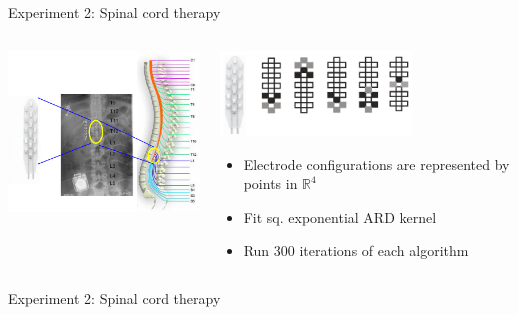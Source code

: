 \documentclass[xetex,10pt,mathserif]{beamer}
\newlength\figureheight
\newlength\figurewidth
\begin{document}
\begin{frame}{Experiment 2: Spinal cord therapy}
\begin{columns}[c]
\begin{center}
\includegraphics[width=2.5in]{figures/config1.png}
\end{center}
\begin{center}
\includegraphics[width=2in]{figures/config2.png}
\vspace{2em}
\begin{itemize}
\item Electrode configurations are represented by points in $\mathbb{R}^4$
\vspace{1em}
\item Fit sq. exponential ARD kernel
\vspace{1em}
\item Run 300 iterations of each algorithm
\end{itemize}
\end{center}
\end{columns}
\end{frame}

\begin{frame}{Experiment 2: Spinal cord therapy}
\begin{columns}[c]
\begin{center}
\setlength\figurewidth{2.5in}
\setlength\figureheight{1.7in}
\end{center}
\centering
\setlength\figurewidth{2.5in}
\setlength\figureheight{3.7in}
\end{columns}
\end{frame}
\end{document}
